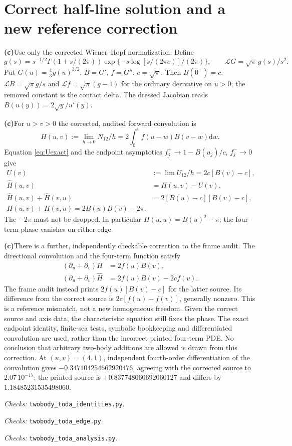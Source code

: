 \documentclass[11pt,a4paper]{article}
\newcommand{\C}{\textbf{(c)}\nobreakspace}
\newcommand{\dd}{\mathrm d}
\newcommand{\file}[1]{\nolinkurl{#1}}
\newcommand{\checks}[1]{\par\noindent\textit{Checks:} \file{twobody_toda_#1.py}.\par}
\begin{document}
\section{Correct half-line solution and a new reference correction}
\C Use only the corrected Wiener--Hopf normalization. Define
\begin{equation}
 g(s)=s^{-1/2}\Gamma(1+s/(2\pi))
       \exp\{-s\log[s/(2\pi e)]/(2\pi)\},\qquad
 \mathcal LG=\sqrt\pi\,g(s)/s^2.
\end{equation}
Put $G(u)=\frac43 y(u)^{3/2}$, $B=G'$, $f=G''$, $c=\sqrt\pi$.
Then $B(0^+)=c$, $\mathcal LB=\sqrt\pi g/s$ and
$\mathcal Lf=\sqrt\pi(g-1)$ for the ordinary derivative on $u>0$;
the removed constant is the contact delta. The dressed Jacobian reads
$B(u(y))=2\sqrt y/u'(y)$.

\C For $u>v>0$ the corrected, audited forward convolution is
\begin{equation}
 H(u,v):=\lim_{h\to0}N_{12}/h
 =2\int_0^v f(u-w)B(v-w)\dd w.
 \label{eq:H}
\end{equation}
Equation \eqref{eq:Uexact} and the endpoint asymptotics
$f_j^+\to1-B(u_j)/c$, $f_j^-\to0$ give
\begin{align}
 U(v)&:=\lim U_{12}/h=2c[B(v)-c],\\
 \widehat H(u,v)&=H(u,v)-U(v),\\
 \widehat H(u,v)+\widehat H(v,u)&=2[B(u)-c][B(v)-c],\\
 \boxed{H(u,v)+H(v,u)=2B(u)B(v)-2\pi.}
 \label{eq:two_recip}
\end{align}
The $-2\pi$ must not be dropped. In particular $H(u,u)=B(u)^2-\pi$;
the four-term phase vanishes on either edge.

\C There is a further, independently checkable correction to the frame
audit. The directional convolution and the four-term function satisfy
\begin{align}
 (\partial_u+\partial_v)H&=2f(u)B(v),\\
 (\partial_u+\partial_v)\widehat H&=2f(u)B(v)-2c f(v).
 \label{eq:PDE}
\end{align}
The frame audit instead prints $2f(u)[B(v)-c]$ for the latter source.
Its difference from the correct source is $2c[f(u)-f(v)]$, generally nonzero.
This is a reference mismatch, not a new homogeneous freedom. Given the
correct source and axis data, the characteristic equation still fixes the
phase. The exact endpoint identity, finite-sea tests, symbolic bookkeeping
and differentiated convolution are used, rather than the incorrect printed
four-term PDE. No conclusion that arbitrary two-body additions are allowed
is drawn from this correction.
At $(u,v)=(4,1)$, independent fourth-order differentiation of the
convolution gives $-0.347104254662920476$, agreeing with the corrected source
to $2.07\,10^{-17}$; the printed source is $+0.837748060692060127$ and
differs by $1.18485231535498060$.
\checks{identities}\checks{edge}\checks{analysis}
\end{document}
